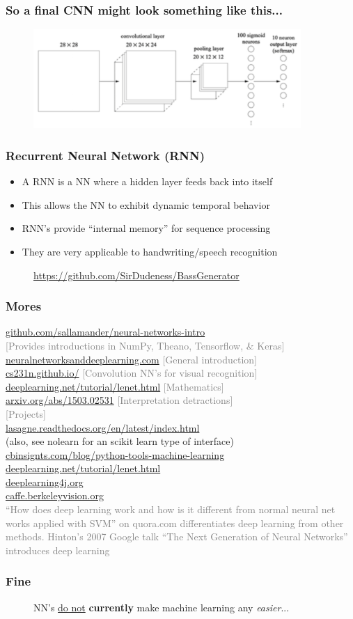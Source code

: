 \documentclass[xcolor={dvipsnames}]{beamer}
\begin{document}
\frame
{
 \frametitle{So a final CNN might look something like this...}

\begin{figure}
\centering
{\includegraphics[width=4in]{stuff/convol4.png}}
\end{figure}

}

\frame
{
\frametitle{Recurrent Neural Network (RNN)}

\begin{itemize}
\item A RNN is a NN where a hidden layer feeds back into itself
\item This allows the NN to exhibit dynamic temporal behavior
\item RNN's provide ``internal memory'' for sequence processing
\item They are very applicable to handwriting/speech recognition
\end{itemize}

\begin{figure}
\centering
\url{https://github.com/SirDudeness/BassGenerator}
\end{figure}
}

\frame
{
 \frametitle{Mores}

\url{github.com/sallamander/neural-networks-intro}\\
\textcolor{gray}{[Provides introductions in NumPy, Theano, Tensorflow, \& Keras]}\\
\url{neuralnetworksanddeeplearning.com} \textcolor{gray}{[General introduction]}\\
\url{cs231n.github.io/} \textcolor{gray}{[Convolution NN's for visual recognition]}\\
\url{deeplearning.net/tutorial/lenet.html} \textcolor{gray}{[Mathematics]}\\
\url{arxiv.org/abs/1503.02531} \textcolor{gray}{[Interpretation detractions]}\\
\textcolor{gray}{[Projects]}\\
\url{lasagne.readthedocs.org/en/latest/index.html}\\
(also, see nolearn for an scikit learn type of interface)\\
\url{cbinsignts.com/blog/python-tools-machine-learning}\\
\url{deeplearning.net/tutorial/lenet.html}\\
\url{deeplearning4j.org}\\
\url{caffe.berkeleyvision.org}\\
\textcolor{gray}{``How does deep learning work and how is it different from normal neural net works applied with SVM'' on quora.com differentiates deep learning from other methods.  Hinton's 2007 Google talk ``The Next Generation of Neural Networks'' introduces deep learning }

}

\frame
{
 \frametitle{Fine}
\begin{figure}
\centering
NN's \underline{do not} \textbf{currently} make machine learning any \emph{easier}...
\end{figure}
 
}
\end{document}
